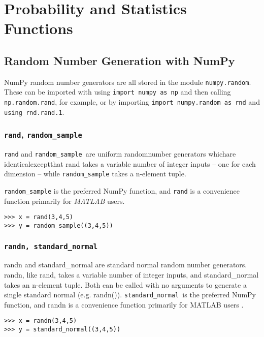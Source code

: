 \documentclass[KSmain.tex]{subfiles}
\begin{document}
 
\section{Probability and Statistics Functions}
\subsection{Random Number Generation with NumPy}
NumPy random number generators are all stored in the module \texttt{numpy.random}. 
These can be imported with using \texttt{import numpy as np} and then calling \texttt{np.random.rand}, for example, or 
by importing \texttt{import numpy.random as rnd} and \texttt{using rnd.rand.1}.
\subsubsection{\texttt{rand}, \texttt{random\_sample}}
\texttt{rand} and \texttt{random\_sample }are uniform randomnumber generators whichare
 identicalexceptthat rand takes a variable number 
of integer inputs – one for each dimension – while \texttt{random\_sample} takes a n-element tuple. 

\texttt{random\_sample} is the preferred NumPy function, and \texttt{rand} is a convenience function primarily for \textit{MATLAB} users.
\begin{framed}
\begin{verbatim}
>>> x = rand(3,4,5) 
>>> y = random_sample((3,4,5))
\end{verbatim}
\end{framed}


\subsubsection{\texttt{randn, standard\_normal}}
randn and standard\_normal are standard normal random number generators. randn, like rand, takes a
variable number of integer inputs, and standard\_normal takes an n-element tuple. Both can be called
with no arguments to generate a single standard normal (e.g. randn()). \texttt{standard\_normal }is the preferred
NumPy function, and randn is a convenience function primarily for MATLAB users .
\begin{framed}
\begin{verbatim}
>>> x = randn(3,4,5)
>>> y = standard_normal((3,4,5))
\end{verbatim}
\end{framed}
\end{document}
